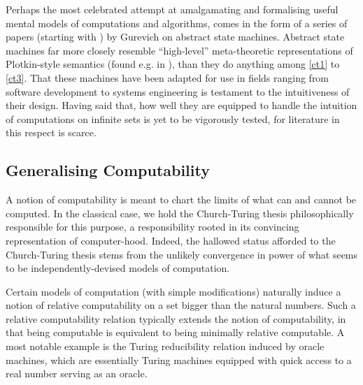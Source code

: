 \documentclass[12pt]{article}
\numberwithin{equation}{section}
\begin{document}
Perhaps the most celebrated attempt at amalgamating and formalising useful mental models of computations and algorithms, comes in the form of a series of papers (starting with \cite{gurevich}) by Gurevich on abstract state machines. Abstract state machines far more closely resemble ``high-level'' meta-theoretic representations of Plotkin-style semantics (found e.g. in \cite{plotkin}), than they do anything among \ref{ct1} to \ref{ct3}. That these machines have been adapted for use in fields ranging from software development to systems engineering is testament to the intuitiveness of their design. Having said that, how well they are equipped to handle the intuition of computations on infinite sets is yet to be vigorously tested, for literature in this respect is scarce.

\subsection{Generalising Computability}\label{subsec22}

A notion of computability is meant to chart the limits of what can and cannot be computed. In the classical case, we hold the Church-Turing thesis philosophically responsible for this purpose, a responsibility rooted in its convincing representation of computer-hood. Indeed, the hallowed status afforded to the Church-Turing thesis stems from the unlikely convergence in power of what seems to be independently-devised models of computation.

Certain models of computation (with simple modifications) naturally induce a notion of relative computability on a set bigger than the natural numbers. Such a relative computability relation typically extends the notion of computability, in that being computable is equivalent to being minimally relative computable. A most notable example is the Turing reducibility relation induced by oracle machines, which are essentially Turing machines equipped with quick access to a real number serving as an oracle. 
\end{document}
